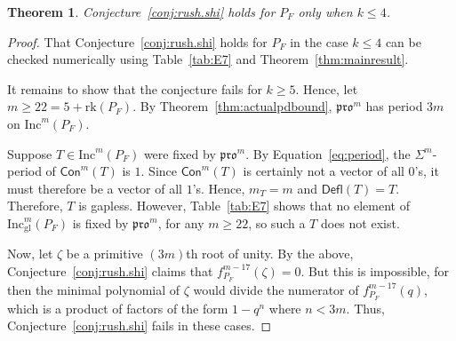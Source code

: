 \documentclass[12pt]{amsart}
\newtheorem{theorem}{Theorem}[section]
\theoremstyle{definition}
\theoremstyle{remark}
\numberwithin{equation}{section}
\newcommand{\inc}{\ensuremath{\mathrm{Inc}}}
\newcommand{\incgl}{\inc_{\mathrm{gl}}}
\newcommand{\pro}{\mathfrak{pro}}
\newcommand{\rank}{\ensuremath{\mathrm{rk}}}
\newcommand{\deflate}{\ensuremath{\mathsf{Defl}}}
\newcommand{\content}{\ensuremath{\mathsf{Con}}}
\begin{document}
\begin{theorem}\label{thm:F_bad}
Conjecture~\ref{conj:rush.shi} holds for $P_F$ only when $k \leq 4$.
\end{theorem}
\begin{proof}
That Conjecture~\ref{conj:rush.shi} holds for $P_F$ in the case $k \leq 4$ can be checked numerically using Table~\ref{tab:E7} and Theorem~\ref{thm:mainresult}.

It remains to show that the conjecture fails for $k \geq 5$. Hence, let $m \geq 22 = 5 +  \rank(P_F)$. By Theorem~\ref{thm:actualpdbound}, $\pro^m$ has period $3m$ on $\inc^m(P_F)$. 

Suppose $T \in \inc^m(P_F)$ were fixed by $\pro^m$.  By Equation~\ref{eq:period}, the $\Sigma^m$-period of $\content^m(T)$ is $1$. Since $\content^m(T)$ is certainly not a vector of all $0$'s, it must therefore be a vector of all $1$'s. Hence, $m_T = m$ and $\deflate(T) = T$. Therefore, $T$ is gapless. However, Table~\ref{tab:E7} shows that no element of $\incgl^m(P_F)$ is fixed by $\pro^m$, for any $m \geq 22$, so such a $T$ does not exist.


Now, let $\zeta$ be a primitive $(3m)$th root of unity. By the above, Conjecture~\ref{conj:rush.shi} claims that $f_{P_F}^{m-17}(\zeta) = 0$. But this is impossible, for then the minimal polynomial of $\zeta$ would divide the numerator of $f^{m-17}_{P_F}(q)$, which is a product of factors of the form $1-q^n$ where $n < 3m$. Thus, Conjecture~\ref{conj:rush.shi} fails in these cases. 
\end{proof}
\end{document}
